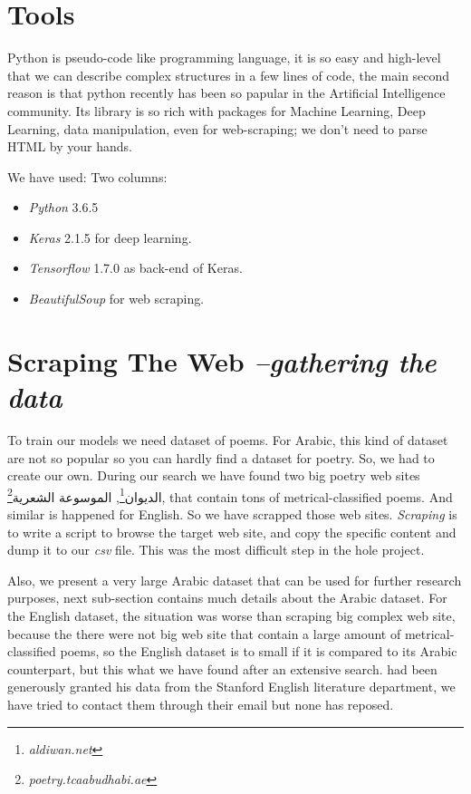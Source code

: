 \documentclass[12pt]{report}
\begin{document}
\section*{Tools}
Python is pseudo-code like programming language, it is so easy and high-level
that we can describe complex structures in a few lines of code, the main second
reason is that python recently has been so papular in the Artificial Intelligence
community. Its library is so rich with packages for Machine Learning, Deep
Learning, data manipulation, even for web-scraping; we don't need to parse HTML
by your hands.

We have used:
Two columns:
\begin{itemize}
\item \textit{Python} 3.6.5
\item \textit{Keras} 2.1.5 for deep learning.
\item \textit{Tensorflow} 1.7.0 as back-end of Keras.
\item \textit{BeautifulSoup} for web scraping.
\end{itemize}







\section*{Scraping The Web \textit{\small --gathering the data}}
To train our models we need dataset of poems. For Arabic, this kind of dataset
are not so popular so you can hardly find a dataset for poetry. So, we had to
create our own. During our search we have found two big poetry web sites
\textarabic{الديوان}\footnote{\textit{aldiwan.net}}, \textarabic{الموسوعة
الشعرية}\footnote{\textit{poetry.tcaabudhabi.ae}}, that
contain tons of metrical-classified poems. And similar is happened for English.
So we have scrapped those web sites. \textit{Scraping} is to write a script to
browse the target web site, and copy the specific content and dump it to our
\textit{csv} file. This was the most difficult step in the hole project. 
 
Also, we present a very large Arabic dataset that can be used for further
research purposes, next sub-section contains much details about the Arabic
dataset. For the English dataset, the situation was worse than scraping big
complex web site, because the there were not big web site that contain a large
amount of metrical-classified poems, so the English dataset is to small if it is
compared to its Arabic counterpart, but this what we have found after an
extensive search. 
\citet{farren} had been generously granted his data from the
Stanford English literature department, we have tried to contact them through
their email but none has reposed.
\end{document}
